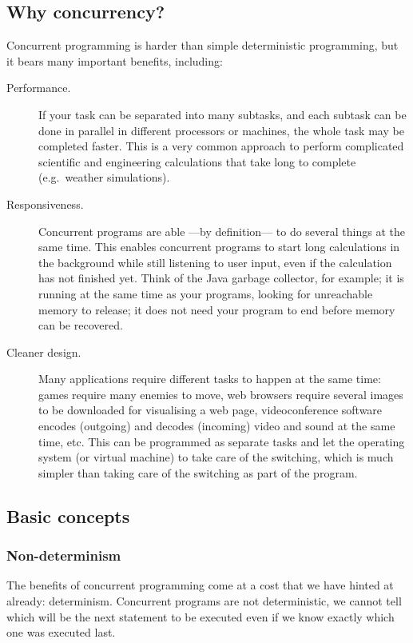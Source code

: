 \subsection{Why concurrency?}
\label{sec:why-concurrency}

Concurrent programming is harder than simple deterministic
programming, but it bears many important benefits, including: 

\begin{description}
\item[Performance. ] If your task can be separated into many subtasks,
  and each subtask can be done in parallel in different processors or
  machines, the whole task may be completed faster. This is a very
  common approach to perform complicated scientific and engineering
  calculations that take long to complete (e.g.~weather simulations).
\item[Responsiveness. ] Concurrent programs are able ---by
  definition--- to do several things at the same time. This enables 
  concurrent programs to start long calculations in the background
  while still listening to user input, even if the calculation has not
  finished yet. Think of the Java garbage collector, for example; it is
  running at the same time as your programs, looking for unreachable
  memory to release; it does not need your program to end before
  memory can be recovered.
\item[Cleaner design. ] Many applications require different tasks to
  happen at the same time: games require many enemies to move, web
  browsers require several images to be downloaded for visualising a
  web page, videoconference software encodes (outgoing) and decodes
  (incoming) video and sound at the same time, etc. This can be
  programmed as separate tasks and let the operating system (or
  virtual machine) to take care of the switching, which is much
  simpler than taking care of the switching as part of the program. 
\end{description}

\subsection{Basic concepts}
\label{sec:basic-concepts}

\subsubsection{Non-determinism}
\label{sec:non-determinism}

The benefits of concurrent programming come at a cost that we have
hinted at already: determinism. Concurrent programs are not
deterministic, we cannot tell which will be the next statement to be
executed even if we know exactly which one was executed last. 

